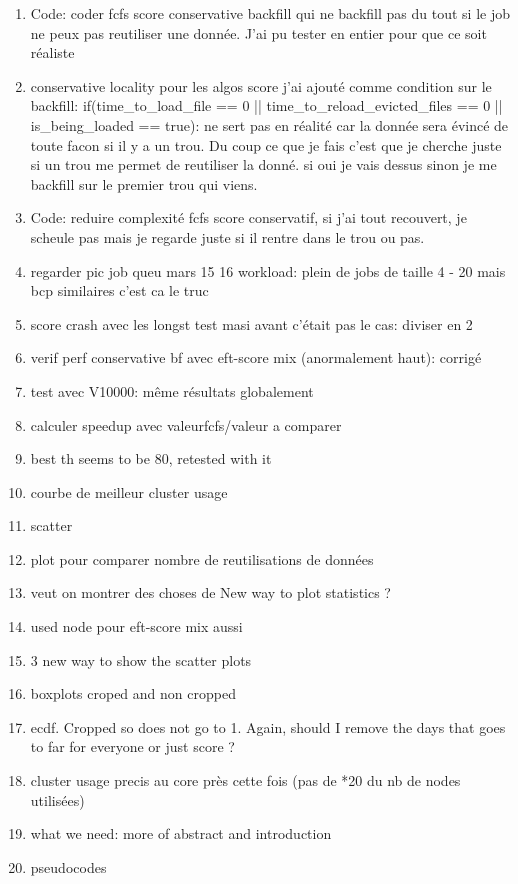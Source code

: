 \documentclass[a4paper]{article}
\begin{document}
\begin{enumerate}
		\item Code: coder fcfs score conservative backfill qui ne backfill pas du tout si le job ne peux pas reutiliser une donnée. J'ai pu tester en entier pour que ce soit réaliste
		\item conservative locality pour les algos score j'ai ajouté comme condition sur le backfill: if(time\_to\_load\_file == 0 || time\_to\_reload\_evicted\_files == 0 || is\_being\_loaded == true): ne sert pas en réalité car la donnée sera évincé de toute facon si il y a un trou. Du coup ce que je fais c'est que je cherche juste si un trou me permet de reutiliser la donné. si oui je vais dessus sinon je me backfill sur le premier trou qui viens.
		\item Code: reduire complexité fcfs score conservatif, si j'ai tout recouvert, je scheule pas mais je regarde juste si il rentre dans le trou ou pas.
		\item regarder pic job queu mars 15 16 workload: plein de jobs de taille 4 - 20 mais bcp similaires c'est ca le truc
		\item score crash avec les longst test masi avant c'était pas le cas: diviser en 2
		\item verif perf conservative bf avec eft-score mix (anormalement haut): corrigé

		\item test avec V10000: même résultats globalement
		\item calculer speedup avec valeurfcfs/valeur a comparer
		\item best th seems to be 80, retested with it
		\item courbe de meilleur cluster usage
		\item scatter
		\item plot pour comparer nombre de reutilisations de données
		\item veut on montrer des choses de New way to plot statistics ?
		\item used node pour eft-score mix aussi
		
		\item 3 new way to show the scatter plots
		\item boxplots croped and non cropped
		\item ecdf. Cropped so does not go to 1. Again, should I remove the days that goes to far for everyone or just score ?
		\item cluster usage precis au core près cette fois (pas de *20 du nb de nodes utilisées)
		\item what we need: more of abstract and introduction
		\item pseudocodes
		

\end{enumerate}
\end{document}
